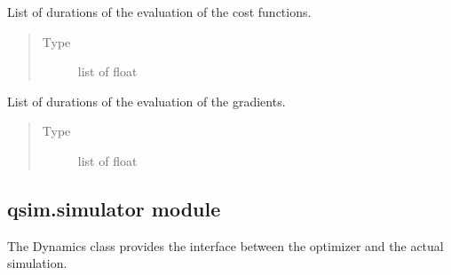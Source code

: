 \documentclass[letterpaper,10pt,english]{sphinxmanual}
\begin{document}
\begin{fulllineitems}
\begin{fulllineitems}
\begin{quote}
\begin{description}
\end{description}\end{quote}

\end{fulllineitems}


\begin{fulllineitems}
\label{\detokenize{qsim:qsim.performance_statistics.PerformanceStatistics.cost_func_eval_times}}
List of durations of the evaluation of the cost functions.
\begin{quote}\begin{description}
\item[{Type}] \leavevmode
list of float

\end{description}\end{quote}

\end{fulllineitems}


\begin{fulllineitems}
\label{\detokenize{qsim:qsim.performance_statistics.PerformanceStatistics.grad_func_eval_times}}
List of durations of the evaluation of the gradients.
\begin{quote}\begin{description}
\item[{Type}] \leavevmode
list of float

\end{description}\end{quote}

\end{fulllineitems}


\end{fulllineitems}



\subsection{qsim.simulator module}
\label{\detokenize{qsim:module-qsim.simulator}}\label{\detokenize{qsim:qsim-simulator-module}}
The Dynamics class provides the interface between the optimizer and the
actual simulation.
\end{document}
